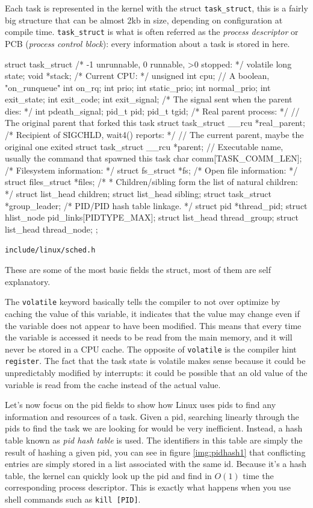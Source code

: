 \documentclass[10pt]{book}
\begin{document}
Each task is represented in the kernel with the struct \verb|task_struct|, this is a fairly big structure that can be almost 2kb in size, depending on configuration at compile time. \verb|task_struct| is what is often referred as the \textit{process descriptor} or PCB (\textit{process control block}): every information about a task is stored in here. 
\begin{code}
struct task_struct {
	/* -1 unrunnable, 0 runnable, >0 stopped: */
	volatile long			state;
	void				*stack;
	/* Current CPU: */
	unsigned int			cpu;
	// A boolean, "on_runqueue"
	int				on_rq; 
	int				prio;
	int				static_prio;
	int				normal_prio;
        int				exit_state;
	int				exit_code;
	int				exit_signal;
	/* The signal sent when the parent dies: */
	int				pdeath_signal;
	pid_t				pid;
	pid_t				tgid;
        /* Real parent process: */
        // The original parent that forked this task
	struct task_struct __rcu	*real_parent;
	/* Recipient of SIGCHLD, wait4() reports: */
	// The current parent, maybe the original one exited
	struct task_struct __rcu	*parent;
	// Executable name, usually the command that spawned this task
	char				comm[TASK_COMM_LEN]; 
        /* Filesystem information: */
	struct fs_struct		   *fs;
	/* Open file information: */
	struct files_struct		*files;
	/*
	 * Children/sibling form the list of natural children:
	 */
	struct list_head		children;
	struct list_head		sibling;
	struct task_struct	   *group_leader;
	/* PID/PID hash table linkage. */
	struct pid			*thread_pid;
	struct hlist_node	   pid_links[PIDTYPE_MAX];
	struct list_head		thread_group;
	struct list_head		thread_node;
};
\end{code}
\verb|include/linux/sched.h|

These are some of the most basic fields the struct, most of them are self explanatory.

The \verb|volatile| keyword basically tells the compiler to not over optimize by caching the value of this variable, it indicates that the value may change even if the variable does not appear to have been modified. This means that every time the variable is accessed it needs to be read from the main memory, and it will never be stored in a CPU cache. The opposite of \verb|volatile| is the compiler hint \verb|register|. The fact that the task state is volatile makes sense because it could be unpredictably modified by interrupts: it could be possible that an old value of the variable is read from the cache instead of the actual value.

Let's now focus on the pid fields to show how Linux uses pids to find any information and resources of a task. Given a pid, searching linearly through the pids to find the task we are looking for would be very inefficient. Instead, a hash table known as \textit{pid hash table} is used. The identifiers in this table are simply the result of hashing a given pid, you can see in figure \ref{img:pidhash1} that conflicting entries are simply stored in a list associated with the same id. Because it's a hash table, the kernel can quickly look up the pid and find in $O(1)$ time the corresponding process descriptor. This is exactly what happens when you use shell commands such as \verb|kill [PID]|.
\end{document}
